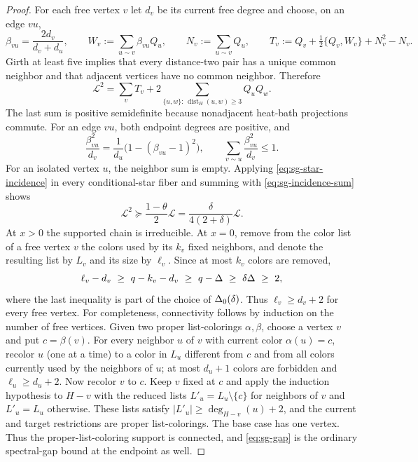 \begin{proof}
For each free vertex $v$ let $d_v$ be its current free degree and choose, on
an edge $vu$,
\[
 \beta_{vu}=\frac{2d_v}{d_v+d_u},\qquad
 W_v:=\sum_{u\sim v}\beta_{vu}Q_u,\qquad
 N_v:=\sum_{u\sim v}Q_u,\qquad
 T_v:=Q_v+\tfrac12\{Q_v,W_v\}+N_v^2-N_v.
\]
Girth at least five implies that every distance-two pair has a unique common
neighbor and that adjacent vertices have no common neighbor.  Therefore
\begin{equation}\label{eq:sg-global-decomposition}
 \mathcal L^2=\sum_vT_v+2\sum_{\{u,w\}:\,\operatorname{dist}_H(u,w)\ge3}Q_uQ_w.
\end{equation}
The last sum is positive semidefinite because nonadjacent heat-bath
projections commute.  For an edge $vu$, both endpoint degrees are
positive, and
\begin{equation}\label{eq:sg-incidence-sum}
 \frac{\beta_{vu}^2}{d_v}=\frac{1}{d_u}\bigl(1-(\beta_{vu}-1)^2\bigr),
 \qquad \sum_{v\sim u}\frac{\beta_{vu}^2}{d_v}\le1.
\end{equation}
For an isolated vertex $u$, the neighbor sum is empty.
Applying \eqref{eq:sg-star-incidence} in every conditional-star fiber and summing with \eqref{eq:sg-incidence-sum}
shows
\[
 \mathcal L^2\succeq \frac{1-\theta}{2}\mathcal L
 =\frac{\delta}{4(2+\delta)}\mathcal L.
\]
At $x>0$ the supported chain is irreducible. At $x=0$, remove from the
color list of a free vertex $v$ the colors used by its $k_v$ fixed
neighbors, and denote the resulting list by $L_v$ and its size by
$\ell_v$.  Since at most
$k_v$ colors are removed,
\[
 \ell_v-d_v\ \ge\ q-k_v-d_v
 \ \ge\ q-\Deg
 \ \ge\ \delta\Deg\ \ge\ 2,
\]
where the last inequality is part of the choice of $\Delta_0(\delta)$.
Thus $\ell_v\ge d_v+2$ for every free vertex.  For completeness,
connectivity follows by induction on the number of free vertices.  Given
two proper list-colorings $\alpha,\beta$, choose a vertex $v$ and put
$c=\beta(v)$.  For every neighbor $u$ of $v$ with current color
$\alpha(u)=c$, recolor $u$ (one at a time) to a color in $L_u$ different
from $c$ and from all colors currently used by the neighbors of $u$;
at most $d_u+1$ colors are forbidden and $\ell_u\ge d_u+2$.  Now recolor
$v$ to $c$.  Keep $v$ fixed at $c$ and apply the induction hypothesis to
$H-v$ with the reduced lists
$L'_u=L_u\setminus\{c\}$ for neighbors of $v$ and $L'_u=L_u$ otherwise.
These lists satisfy $|L'_u|\ge\deg_{H-v}(u)+2$, and the current and target
restrictions are proper list-colorings.  The base case has one vertex.
Thus the proper-list-coloring support is connected, and
\eqref{eq:sg-gap} is the ordinary spectral-gap bound at the endpoint as well.
\end{proof}
